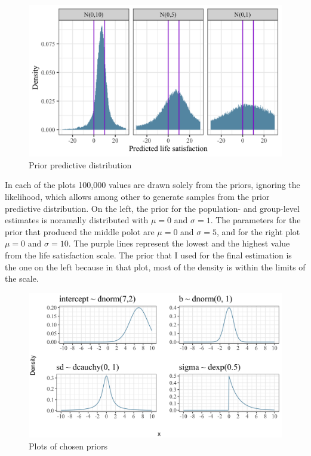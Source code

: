 \documentclass[a4, 12pt]{article}
\begin{document}
\begin{figure}[H]

{\centering \includegraphics[width=0.8\linewidth,]{../figures/prior_predict} 

}

\caption{Prior predictive distribution}\label{fig:lsat-predicted}
\end{figure}

In each of the plots 100,000 values are drawn solely from the priors, ignoring the likelihood, which allows among other to generate samples from the prior predictive distribution. On the left, the prior for the population- and group-level estimates is noramally distributed with \(\mu=0\) and \(\sigma=1\). The parameters for the prior that produced the middle polot are \(\mu=0\) and \(\sigma=5\), and for the right plot \(\mu=0\) and \(\sigma=10\). The purple lines represent the lowest and the highest value from the life satisfaction scale. The prior that I used for the final estimation is the one on the left because in that plot, most of the density is within the limits of the scale.

\begin{figure}[H]

{\centering \includegraphics[width=0.8\linewidth,]{../figures/plot_priors} 

}

\caption{Plots of chosen priors}\label{fig:chosen-priors}
\end{figure}
\end{document}
